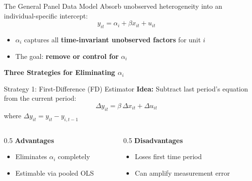 \documentclass[aspectratio=169]{beamer}
\begin{document}
\begin{frame}{The General Panel Data Model}
  Absorb unobserved heterogeneity into an individual-specific intercept:
  \[
    y_{it} = \alpha_i + \beta x_{it} + u_{it}
  \]
  \begin{itemize}
    \item $\alpha_i$ captures all \textbf{time-invariant unobserved factors} for unit $i$
    \item The goal: \textbf{remove or control for} $\alpha_i$
  \end{itemize}

  \vspace{0.5em}
\end{frame}

\begin{frame}[plain]
  \begin{center}
    \vspace{2.5em}
    {\Large\bfseries\color{oxblue} Three Strategies for Eliminating $\alpha_i$}
  \end{center}
\end{frame}

\begin{frame}{Strategy 1: First-Difference (FD) Estimator}
  \textbf{Idea:} Subtract last period's equation from the current period:
  \[
    \Delta y_{it} = \beta\,\Delta x_{it} + \Delta u_{it}
  \]
  where $\Delta y_{it} = y_{it} - y_{i,t-1}$

  \vspace{0.8em}
  \begin{columns}[T]
    \begin{column}{0.5\textwidth}
      \textbf{Advantages}
      \begin{itemize}
        \item Eliminates $\alpha_i$ completely
        \item Estimable via pooled OLS
      \end{itemize}
    \end{column}
    \begin{column}{0.5\textwidth}
      \textbf{Disadvantages}
      \begin{itemize}
        \item Loses first time period
        \item Can amplify measurement error
      \end{itemize}
    \end{column}
  \end{columns}
\end{frame}
\end{document}
